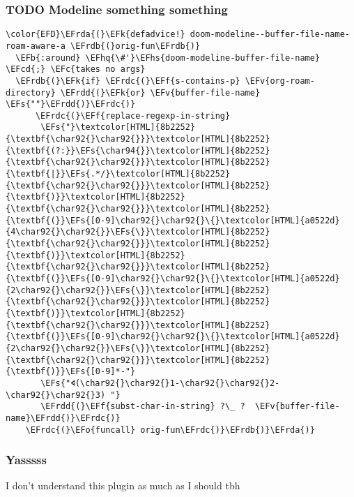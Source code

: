 \documentclass{article}
\newcommand{\EFc}[1]{\textcolor{EFc}{#1}} %
\newcommand{\EFcd}[1]{\textcolor{EFcd}{#1}} %
\newcommand{\EFs}[1]{\textcolor{EFs}{#1}} %
\newcommand{\EFk}[1]{\textcolor{EFk}{#1}} %
\newcommand{\EFb}[1]{\textcolor{EFb}{#1}} %
\newcommand{\EFf}[1]{\textcolor{EFf}{#1}} %
\newcommand{\EFv}[1]{\textcolor{EFv}{#1}} %
\newcommand{\EFo}[1]{\textcolor{EFo}{#1}} %
\newcommand{\EFhq}[1]{#1} %
\newcommand{\EFhs}[1]{\textcolor{EFhs}{#1}} %
\newcommand{\EFrda}[1]{\textcolor{EFrda}{#1}} %
\newcommand{\EFrdb}[1]{\textcolor{EFrdb}{#1}} %
\newcommand{\EFrdc}[1]{\textcolor{EFrdc}{#1}} %
\newcommand{\EFrdd}[1]{\textcolor{EFrdd}{#1}} %
\begin{document}
\subsubsection{{\bfseries\sffamily TODO} Modeline something something}
\label{sec:org36c7921}
\begin{Code}
\begin{Verbatim}
\color{EFD}\EFrda{(}\EFk{defadvice!} doom-modeline--buffer-file-name-roam-aware-a \EFrdb{(}orig-fun\EFrdb{)}
  \EFb{:around} \EFhq{\#'}\EFhs{doom-modeline-buffer-file-name} \EFcd{;} \EFc{takes no args}
  \EFrdb{(}\EFk{if} \EFrdc{(}\EFf{s-contains-p} \EFv{org-roam-directory} \EFrdd{(}\EFk{or} \EFv{buffer-file-name} \EFs{""}\EFrdd{)}\EFrdc{)}
      \EFrdc{(}\EFf{replace-regexp-in-string}
       \EFs{"}\textcolor[HTML]{8b2252}{\textbf{\char92{}\char92{}}}\textcolor[HTML]{8b2252}{\textbf{(?:}}\EFs{\char94{}}\textcolor[HTML]{8b2252}{\textbf{\char92{}\char92{}}}\textcolor[HTML]{8b2252}{\textbf{|}}\EFs{.*/}\textcolor[HTML]{8b2252}{\textbf{\char92{}\char92{}}}\textcolor[HTML]{8b2252}{\textbf{)}}\textcolor[HTML]{8b2252}{\textbf{\char92{}\char92{}}}\textcolor[HTML]{8b2252}{\textbf{(}}\EFs{[0-9]\char92{}\char92{}\{}\textcolor[HTML]{a0522d}{4\char92{}\char92{}}\EFs{\}}\textcolor[HTML]{8b2252}{\textbf{\char92{}\char92{}}}\textcolor[HTML]{8b2252}{\textbf{)}}\textcolor[HTML]{8b2252}{\textbf{\char92{}\char92{}}}\textcolor[HTML]{8b2252}{\textbf{(}}\EFs{[0-9]\char92{}\char92{}\{}\textcolor[HTML]{a0522d}{2\char92{}\char92{}}\EFs{\}}\textcolor[HTML]{8b2252}{\textbf{\char92{}\char92{}}}\textcolor[HTML]{8b2252}{\textbf{)}}\textcolor[HTML]{8b2252}{\textbf{\char92{}\char92{}}}\textcolor[HTML]{8b2252}{\textbf{(}}\EFs{[0-9]\char92{}\char92{}\{}\textcolor[HTML]{a0522d}{2\char92{}\char92{}}\EFs{\}}\textcolor[HTML]{8b2252}{\textbf{\char92{}\char92{}}}\textcolor[HTML]{8b2252}{\textbf{)}}\EFs{[0-9]*-"}
       \EFs{"🢔(\char92{}\char92{}1-\char92{}\char92{}2-\char92{}\char92{}3) "}
       \EFrdd{(}\EFf{subst-char-in-string} ?\_ ?  \EFv{buffer-file-name}\EFrdd{)}\EFrdc{)}
    \EFrdc{(}\EFo{funcall} orig-fun\EFrdc{)}\EFrdb{)}\EFrda{)}
\end{Verbatim}
\end{Code}

\subsubsection{Yasssss}
\label{sec:orgb8cbc77}
I don't understand this plugin as much as I should tbh
\end{document}

